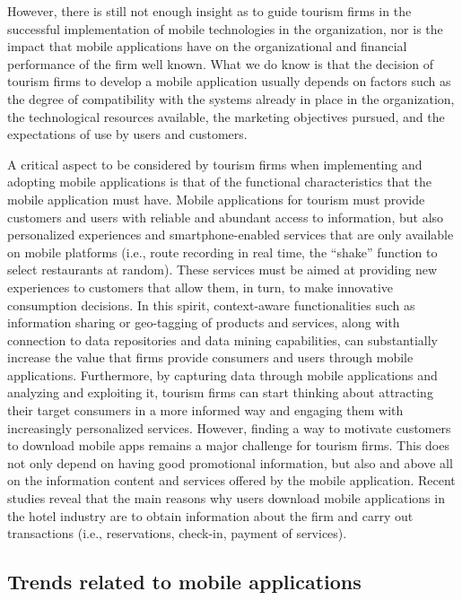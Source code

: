 \documentclass[
  letterpaper,
  DIV=11,
  numbers=noendperiod]{scrreprt}
\begin{document}
However, there is still not enough insight as to guide tourism firms in
the successful implementation of mobile technologies in the
organization, nor is the impact that mobile applications have on the
organizational and financial performance of the firm well known. What we
do know is that the decision of tourism firms to develop a mobile
application usually depends on factors such as the degree of
compatibility with the systems already in place in the organization, the
technological resources available, the marketing objectives pursued, and
the expectations of use by users and customers.

A critical aspect to be considered by tourism firms when implementing
and adopting mobile applications is that of the functional
characteristics that the mobile application must have. Mobile
applications for tourism must provide customers and users with reliable
and abundant access to information, but also personalized experiences
and smartphone-enabled services that are only available on mobile
platforms (i.e., route recording in real time, the ``shake'' function to
select restaurants at random). These services must be aimed at providing
new experiences to customers that allow them, in turn, to make
innovative consumption decisions. In this spirit, context-aware
functionalities such as information sharing or geo-tagging of products
and services, along with connection to data repositories and data mining
capabilities, can substantially increase the value that firms provide
consumers and users through mobile applications. Furthermore, by
capturing data through mobile applications and analyzing and exploiting
it, tourism firms can start thinking about attracting their target
consumers in a more informed way and engaging them with increasingly
personalized services. However, finding a way to motivate customers to
download mobile apps remains a major challenge for tourism firms. This
does not only depend on having good promotional information, but also
and above all on the information content and services offered by the
mobile application. Recent studies reveal that the main reasons why
users download mobile applications in the hotel industry are to obtain
information about the firm and carry out transactions (i.e.,
reservations, check-in, payment of services).

\hypertarget{trends-related-to-mobile-applications}{%
\subsection{Trends related to mobile
applications}\label{trends-related-to-mobile-applications}}
\end{document}
